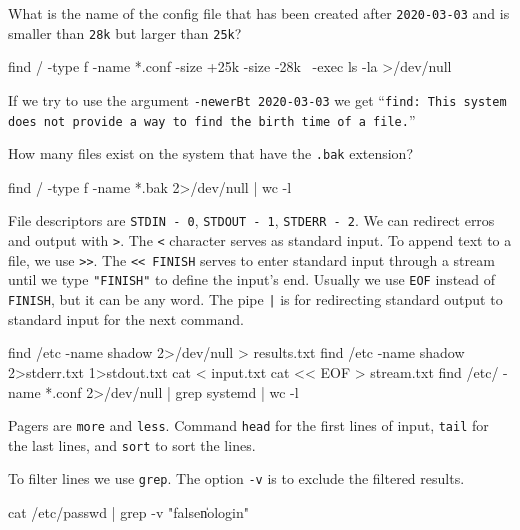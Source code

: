 \documentclass[a4paper,10pt]{article}
\begin{document}
\n

What is the name of the config file that has been created after \texttt{2020-03-03} and is smaller than \texttt{28k} but larger than \texttt{25k}?
\begin{bash}
find / -type f -name *.conf -size +25k -size -28k \
-exec ls -la {} >/dev/null
\end{bash}

If we try to use the argument \texttt{-newerBt 2020-03-03} we get
``\texttt{find: This system does not provide a way to find the birth time of a file.}''

\n

How many files exist on the system that have the \texttt{.bak} extension?
\begin{bash}
find / -type f -name *.bak 2>/dev/null | wc -l
\end{bash}

\n

File descriptors are \texttt{STDIN - 0}, \texttt{STDOUT - 1}, \texttt{STDERR - 2}. We can redirect erros and output with \texttt{>}. The \texttt{<} character serves as standard input. To append text to a file, we use \texttt{>>}. The \texttt{<< FINISH} serves to enter standard input through a stream until we type \texttt{"FINISH"} to define the input's end. Usually we use \texttt{EOF} instead of \texttt{FINISH}, but it can be any word. The pipe \texttt{|} is for redirecting standard output to standard input for the next command.
\begin{bash}
find /etc -name shadow 2>/dev/null > results.txt
find /etc -name shadow 2>stderr.txt 1>stdout.txt
cat < input.txt
cat << EOF > stream.txt
find /etc/ -name *.conf 2>/dev/null | grep systemd | wc -l
\end{bash}

\n

Pagers are \texttt{more} and \texttt{less}. Command \texttt{head} for the first lines of input, \texttt{tail} for the last lines, and \texttt{sort} to sort the lines.

\n

To filter lines we use \texttt{grep}. The option \texttt{-v} is to exclude the filtered results.
\begin{bash}
cat /etc/passwd | grep -v "false\|nologin"
\end{bash}
\end{document}
